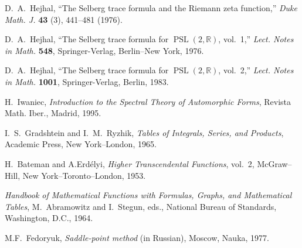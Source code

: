\documentclass{amsart}
\theoremstyle{plain}
\theoremstyle{definition}
\numberwithin{equation}{section}
\begin{document}
\begin{thebibliography}{99}
D.~A.~Hejhal,
``The Selberg trace formula and the Riemann zeta function,''
\textit{Duke Math. J.}
\textbf{43}
(3), 441--481
(1976).

D.~A.~Hejhal,
``The Selberg trace formula for $\operatorname{PSL}(2,\mathbb{R})$,
 vol.~1,'' \textit{Lect. Notes in Math.}
\textbf{548},
Springer-Verlag, Berlin--New York,
1976.

D.~A.~Hejhal,
``The Selberg trace formula for $\operatorname{PSL}(2,\mathbb{R})$,
vol.~2,'' \textit{Lect. Notes in Math.}
\textbf{1001},
Springer-Verlag, Berlin,
1983.

H.~Iwaniec,
\textit{Introduction to the Spectral Theory of Automorphic Forms},
Revista Math. Iber.,
Madrid, 1995.

I.~S.~Gradshtein and I.~M.~Ryzhik,
\textit{Tables of Integrals, Series, and Products},
Academic Press, New York--London,
1965.


H.~Bateman and A.Erd\'elyi,
\textit{Higher Transcendental Functions},
vol.~2, McGraw--Hill, New York--Toronto--London,
1953.

\textit{Handbook of Mathematical Functions with Formulas, Graphs, and
Mathematical Tables}, M.~Abramowitz and I.~Stegun, eds.,
National Bureau of Standards, Washington, D.C., 1964.

M.F.~Fedoryuk, \textit{Saddle-point method} (in Russian), Moscow, Nauka, 1977.

\end{thebibliography}
\end{document}
